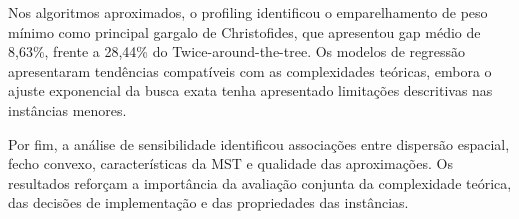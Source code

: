 Nos algoritmos aproximados, o profiling identificou o emparelhamento de peso mínimo como principal gargalo de Christofides, que apresentou gap médio de 8,63\%, frente a 28,44\% do Twice-around-the-tree. Os modelos de regressão apresentaram tendências compatíveis com as complexidades teóricas, embora o ajuste exponencial da busca exata tenha apresentado limitações descritivas nas instâncias menores.

Por fim, a análise de sensibilidade identificou associações entre dispersão espacial, fecho convexo, características da MST e qualidade das aproximações. Os resultados reforçam a importância da avaliação conjunta da complexidade teórica, das decisões de implementação e das propriedades das instâncias.





